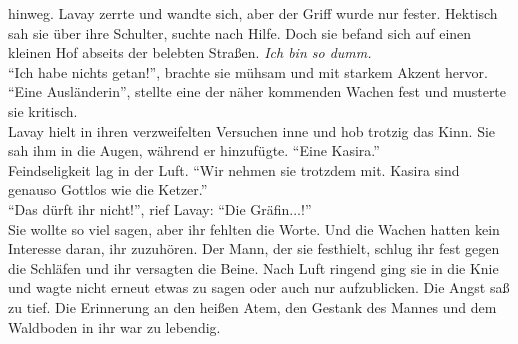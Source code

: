 hinweg. Lavay zerrte und wandte sich, aber der Griff wurde nur fester. Hektisch sah sie über ihre 
Schulter, suchte nach Hilfe. Doch sie befand sich auf einen kleinen Hof abseits der belebten 
Straßen. \textit{Ich bin so dumm.}\\
``Ich habe nichts getan!'', brachte sie mühsam und mit starkem Akzent hervor.\\
``Eine Ausländerin'', stellte eine der näher kommenden Wachen fest und musterte sie kritisch.\\
Lavay hielt in ihren verzweifelten Versuchen inne und hob trotzig das Kinn. Sie sah ihm in die 
Augen, während er hinzufügte. ``Eine Kasira.''\\
Feindseligkeit lag in der Luft. ``Wir nehmen sie trotzdem mit. Kasira sind genauso Gottlos wie die 
Ketzer.''\\
``Das dürft ihr nicht!'', rief Lavay: ``Die Gräfin...!''\\
Sie wollte so viel sagen, aber ihr fehlten die Worte. Und die Wachen hatten kein Interesse daran, 
ihr zuzuhören. Der Mann, der sie festhielt, schlug ihr fest gegen die Schläfen und ihr versagten 
die Beine. Nach Luft ringend ging sie in die Knie und wagte nicht erneut etwas zu sagen oder auch 
nur aufzublicken. Die Angst saß zu tief. Die Erinnerung an den heißen Atem, den Gestank des Mannes 
und dem Waldboden in ihr war zu lebendig.\\

